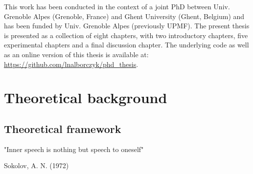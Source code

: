\documentclass[a4paper,12pt,twoside,openright,oldfontcommands,final]{memoir}
\newcommand{\initial}[1]{
	\lettrine[lines=3,lhang=0.33,nindent=0em]{
		\color{gray}
     		{\textsc{#1}}}{}}
\newcommand{\clearemptydoublepage}{\newpage{\thispagestyle{empty}\cleardoublepage}}
\begin{document}
\initial{T}his work has been conducted in the context of a joint PhD between Univ. Grenoble Alpes (Grenoble, France) and Ghent University (Ghent, Belgium) and has been funded by Univ. Grenoble Alpes (previously UPMF). The present thesis is presented as a collection of eight chapters, with two introductory chapters, five experimental chapters and a final discussion chapter. The underlying code as well as an online version of this thesis is available at: \url{https://github.com/lnalborczyk/phd_thesis}.

\clearemptydoublepage

\renewcommand{\contentsname}{Table of contents}
\tableofcontents*
{}
\newpage

\listoftables
{}
\newpage

\listoffigures
{}
\newpage


\hypertarget{part-theoretical-background}{%
\part{Theoretical background}\label{part-theoretical-background}}

\sloppy 

\hypertarget{intro}{%
\chapter{Theoretical framework}\label{intro}}

\epigraph{"Inner speech is nothing but speech to oneself"}{Sokolov, A. N. (1972)}
\end{document}
